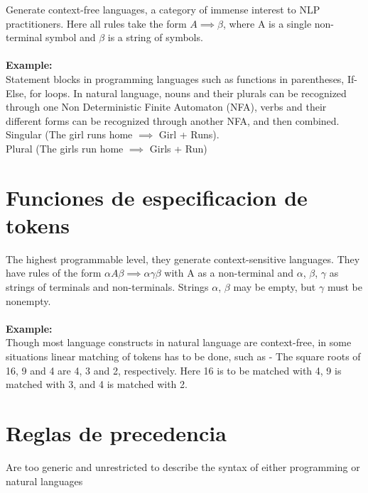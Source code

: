 \documentclass[
	12pt, %
]{fphw}
\begin{document}
Generate context-free languages, a category of immense interest to NLP practitioners. Here all rules take the form $A \implies \beta$, where A is a single non-terminal symbol and $\beta$ is a string of symbols.\\\\

\textbf{Example:}\\

Statement blocks in programming languages such as functions in parentheses, If-Else, for loops. In natural language, nouns and their plurals can be recognized through one Non Deterministic Finite Automaton (NFA), verbs and their different forms can be recognized through another NFA, and then combined. \\Singular (The girl runs home $\implies$ Girl + Runs). \\Plural (The girls run home $\implies$ Girls + Run)


\newpage
\section*{{\color{Cerulean}Funciones de especificacion de tokens}}
The highest programmable level, they generate context-sensitive languages. They have rules of the form $\alpha A \beta \implies \alpha \gamma \beta$ with A as a non-terminal and $\alpha$, $\beta$, $\gamma$ as strings of terminals and non-terminals. Strings $\alpha$, $\beta$ may be empty, but $\gamma$ must be nonempty.\\\\

\textbf{Example:}\\

Though most language constructs in natural language are context-free, in some situations linear matching of tokens has to be done, such as - The square roots of 16, 9 and 4 are 4, 3 and 2, respectively. Here 16 is to be matched with 4, 9 is matched with 3, and 4 is matched with 2.

\newpage
\section*{{\color{RoyalPurple}Reglas de precedencia}}
Are too generic and unrestricted to describe the syntax of either programming or natural languages\\\\
\end{document}
